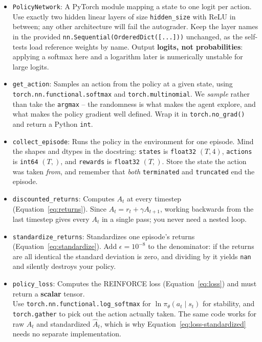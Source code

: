 \begin{itemize}

    \item \texttt{PolicyNetwork}: A PyTorch module mapping a state to one logit
    per action. Use exactly two hidden linear layers of size \verb|hidden_size|
    with ReLU in between; any other architecture will fail the autograder. Keep
    the layer names in the provided \verb|nn.Sequential(OrderedDict([...]))|
    unchanged, as the self-tests load reference weights by name. Output
    \textbf{logits, not probabilities}: applying a softmax here and a logarithm
    later is numerically unstable for large logits.

    \item \texttt{get\_action}: Samples an action from the policy at a given
    state, using \verb|torch.nn.functional.softmax| and \verb|torch.multinomial|.
    We \emph{sample} rather than take the \verb|argmax| -- the randomness is what
    makes the agent explore, and what makes the policy gradient well defined.
    Wrap it in \verb|torch.no_grad()| and return a Python \verb|int|.

    \item \texttt{collect\_episode}: Runs the policy in the environment for one
    episode. Mind the shapes and dtypes in the docstring: \verb|states| is
    \verb|float32| $(T, 4)$, \verb|actions| is \verb|int64| $(T,)$, and
    \verb|rewards| is \verb|float32| $(T,)$. Store the state the action was taken
    \emph{from}, and remember that \emph{both} \verb|terminated| and
    \verb|truncated| end the episode.

    \item \texttt{discounted\_returns}: Computes $A_t$ at every timestep
    (Equation~\ref{eq:returns}). Since $A_t = r_t + \gamma A_{t+1}$, working
    backwards from the last timestep gives every $A_t$ in a single pass; you
    never need a nested loop.

    \item \texttt{standardize\_returns}: Standardizes one episode's returns
    (Equation~\ref{eq:standardize}). Add $\epsilon = 10^{-8}$ to the denominator:
    if the returns are all identical the standard deviation is zero, and
    dividing by it yields \texttt{nan} and silently destroys your policy.

    \item \texttt{policy\_loss}: Computes the REINFORCE loss
    (Equation~\ref{eq:loss}) and must return a \textbf{scalar} tensor.\\
    Use
    \verb|torch.nn.functional.log_softmax| for $\ln \pi_\theta(a_t \mid s_t)$
    for stability, and \verb|torch.gather| to
    pick out the action actually taken. The same code works for raw $A_t$ and
    standardized $\hat{A}_t$, which is why
    Equation~\ref{eq:loss-standardized} needs no separate implementation.


\end{itemize}

